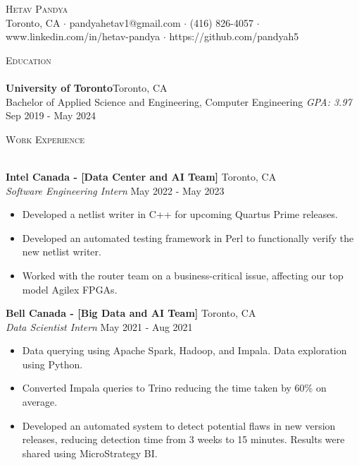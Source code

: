\documentclass[a4paper]{article}
\newcommand{\lineunder} {
    \vspace*{-8pt} \\
    \hspace*{-18pt} \hrulefill \\
}
\newcommand{\header} [1] {
    {\hspace*{-18pt}\vspace*{6pt} \textsc{#1}}
    \vspace*{-6pt} \lineunder
}
\begin{document}
\vspace*{-40pt}



\vspace*{-10pt}
\begin{center}
	{\Huge \scshape {Hetav Pandya}}\\
	Toronto, CA $\cdot$ pandyahetav1@gmail.com $\cdot$ (416) 826-4057 $\cdot$ www.linkedin.com/in/hetav-pandya $\cdot$ https://github.com/pandyah5\\
\end{center}

\header{Education}
\textbf{University of Toronto}\hfill Toronto, CA\\
Bachelor of Applied Science and Engineering, Computer Engineering \textit{GPA: 3.97} \hfill Sep 2019 - May 2024\\
\vspace{2mm}

\header{Work Experience}
\vspace{1mm}

\textbf{Intel Canada - [Data Center and AI Team]} \hfill Toronto, CA\\
\textit{Software Engineering Intern} \hfill May 2022 - May 2023\\
\vspace{-1mm}
\begin{itemize} \itemsep 1pt
	\item Developed a netlist writer in C++ for upcoming Quartus Prime releases.
	\item Developed an automated testing framework in Perl to functionally verify the new netlist writer.
	\item Worked with the router team on a business-critical issue, affecting our top model Agilex FPGAs. 
\end{itemize}

\textbf{Bell Canada - [Big Data and AI Team]} \hfill Toronto, CA\\
\textit{Data Scientist Intern} \hfill May 2021 - Aug 2021\\
\vspace{-1mm}
\begin{itemize} \itemsep 1pt
	\item Data querying using Apache Spark, Hadoop, and Impala. Data exploration using Python.
	\item Converted Impala queries to Trino reducing the time taken by 60\% on average.
	\item Developed an automated system to detect potential flaws in new version releases, reducing detection time from 3 weeks to 15 minutes. Results were shared using MicroStrategy BI.
\end{itemize}
\end{document}
